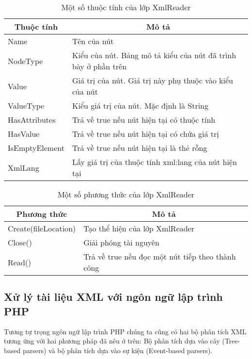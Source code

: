 \begin{center}
\begin{longtable}{|m{3cm}|m{8cm}|}
\caption [Một số thuộc tính của lớp XmlReader]{Một số thuộc tính của lớp XmlReader}
 \endfirsthead
 \endhead

\hline
\multicolumn{1}{|c|}{\textbf{Thuộc tính}} &	\multicolumn{1}{c|}{\textbf{Mô tả}}\\ \hline
Name &	Tên của nút\\ \hline
NodeType &	Kiểu của nút. Bảng mô tả kiểu của nút đã trình bày ở phần trên\\ \hline
Value&	Giá trị của nút. Giá trị này phụ thuộc vào kiểu của nút\\ \hline
ValueType &	Kiểu giá trị của nút. Mặc định là String\\ \hline
HasAttributes &	Trả về true nếu nút hiện tại có thuộc tính\\ \hline
HasValue &	Trả về true nếu nút hiện tại có chứa giá trị\\ \hline
IsEmptyElement &	Trả về true nếu nút hiện tại là thẻ rỗng\\ \hline
XmlLang	& Lấy giá trị của thuộc tính xml:lang của nút hiện tại\\ \hline

\end{longtable}
\end{center}
\vspace{-1cm}


\begin{center}
\begin{longtable}{|m{4cm}|m{6cm}|}
\caption [Một số phương thức của lớp XmlReader]{Một số phương thức của lớp XmlReader}
 \endfirsthead
 \endhead

\hline

\multicolumn{1}{|c|}{\textbf{Phương thức}} &	\multicolumn{1}{c|}{\textbf{Mô tả}}\\ \hline
Create(fileLocation) &	Tạo thể hiện của lớp XmlReader\\ \hline
Close()&	Giải phóng tài nguyên\\ \hline
Read()&	Trả về true nếu đọc một nút tiếp theo thành công\\ \hline

\end{longtable}
\end{center}
\vspace{-1cm}
\subsection{Xử lý tài liệu XML với ngôn ngữ lập trình PHP}
Tương tự trọng ngôn ngữ lập trình PHP chúng ta cũng có hai bộ phân tích XML tương ứng với hai phương pháp đã nêu ở trên: Bộ phân tích dựa vào cây (Tree-based parsers) và bộ phân tích dựa vào sự kiện (Event-based parsers).
